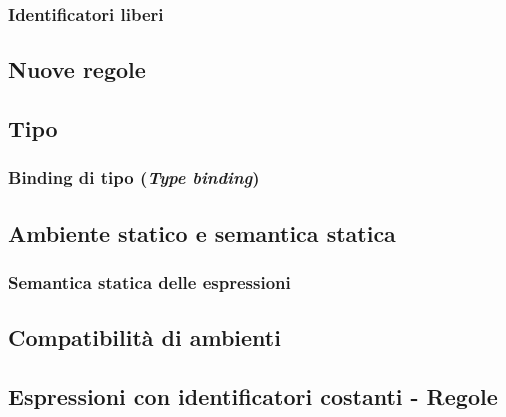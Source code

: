 \documentclass[a4paper]{article}
\begin{document}
	\subsubsection{Identificatori liberi}
	
	\subsection{Nuove regole}
	
	\subsection{Tipo}
	
	\subsubsection{Binding di tipo (\emph{Type binding})}
	
	\subsection{Ambiente statico e semantica statica}
	
	\subsubsection{Semantica statica delle espressioni}
	
	\subsection{Compatibilità di ambienti}
	
	\subsection{Espressioni con identificatori costanti - Regole}
\end{document}
